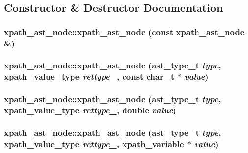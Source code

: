 \subsection{Constructor \& Destructor Documentation}
\hypertarget{classxpath__ast__node_ae5a059e41b41505bef1f7dbebda8070b}{
\subsubsection[{xpath\_\-ast\_\-node}]{\setlength{\rightskip}{0pt plus 5cm}xpath\_\-ast\_\-node::xpath\_\-ast\_\-node (const {\bf xpath\_\-ast\_\-node} \&)}}
\label{classxpath__ast__node_ae5a059e41b41505bef1f7dbebda8070b}
\hypertarget{classxpath__ast__node_af155d17a4477a693d37f4e34957dcc21}{
\subsubsection[{xpath\_\-ast\_\-node}]{\setlength{\rightskip}{0pt plus 5cm}xpath\_\-ast\_\-node::xpath\_\-ast\_\-node ({\bf ast\_\-type\_\-t} {\em type}, \/  xpath\_\-value\_\-type {\em rettype\_\-}, \/  const char\_\-t $\ast$ {\em value})}}
\label{classxpath__ast__node_af155d17a4477a693d37f4e34957dcc21}
\hypertarget{classxpath__ast__node_ada97458f3fc7d6c87cf70d8084117b0d}{
\subsubsection[{xpath\_\-ast\_\-node}]{\setlength{\rightskip}{0pt plus 5cm}xpath\_\-ast\_\-node::xpath\_\-ast\_\-node ({\bf ast\_\-type\_\-t} {\em type}, \/  xpath\_\-value\_\-type {\em rettype\_\-}, \/  double {\em value})}}
\label{classxpath__ast__node_ada97458f3fc7d6c87cf70d8084117b0d}
\hypertarget{classxpath__ast__node_a8de4244f7b9fc7626049197ddc0afab7}{
\subsubsection[{xpath\_\-ast\_\-node}]{\setlength{\rightskip}{0pt plus 5cm}xpath\_\-ast\_\-node::xpath\_\-ast\_\-node ({\bf ast\_\-type\_\-t} {\em type}, \/  xpath\_\-value\_\-type {\em rettype\_\-}, \/  xpath\_\-variable $\ast$ {\em value})}}
